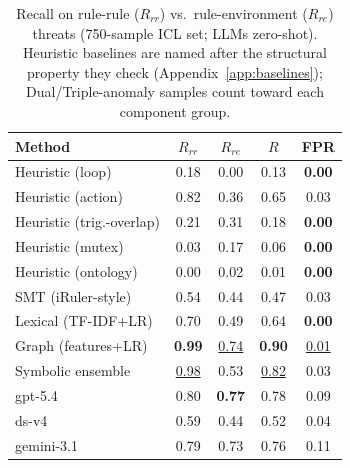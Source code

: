 \begin{table}[h]
\centering
\small
\setlength{\tabcolsep}{4pt}
\caption{Recall on rule-rule ($R_{rr}$) vs.\ rule-environment ($R_{re}$) threats (750-sample ICL set; LLMs zero-shot). Heuristic baselines are named after the structural property they check (Appendix~\ref{app:baselines}); Dual/Triple-anomaly samples count toward each component group.}
\label{tab:groups}
\begin{tabular}{lcccc}
\hline
Method & $R_{rr}$ & $R_{re}$ & $R$ & FPR \\
\hline
Heuristic (loop) & 0.18 & 0.00 & 0.13 & \textbf{0.00} \\
Heuristic (action) & 0.82 & 0.36 & 0.65 & 0.03 \\
Heuristic (trig.-overlap) & 0.21 & 0.31 & 0.18 & \textbf{0.00} \\
Heuristic (mutex) & 0.03 & 0.17 & 0.06 & \textbf{0.00} \\
Heuristic (ontology) & 0.00 & 0.02 & 0.01 & \textbf{0.00} \\
SMT (iRuler-style) & 0.54 & 0.44 & 0.47 & 0.03 \\
Lexical (TF-IDF+LR) & 0.70 & 0.49 & 0.64 & \textbf{0.00} \\
Graph (features+LR) & \textbf{0.99} & \underline{0.74} & \textbf{0.90} & \underline{0.01} \\
Symbolic ensemble & \underline{0.98} & 0.53 & \underline{0.82} & 0.03 \\
\hline
gpt-5.4 & 0.80 & \textbf{0.77} & 0.78 & 0.09 \\
ds-v4 & 0.59 & 0.44 & 0.52 & 0.04 \\
gemini-3.1 & 0.79 & 0.73 & 0.76 & 0.11 \\
\hline
\end{tabular}
\end{table}
